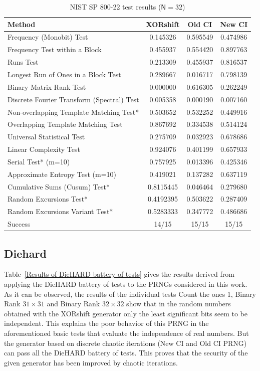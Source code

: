 \begin{table}[!t]
\renewcommand{\arraystretch}{1.3}
\caption{NIST SP 800-22 test results ($\mathsf{N}=32$)}
\label{The passing}
\centering
  \begin{tabular}{|l||c|c|c|}
    \hline
Method &XORshift& Old CI & New CI  \\ \hline\hline

Frequency (Monobit) Test 			&0.145326&0.595549&0.474986 \\ \hline
Frequency Test within a Block  			&0.455937&0.554420&0.897763  \\ \hline
Runs Test 					&0.213309&0.455937&0.816537 \\ \hline
Longest Run of Ones in a Block Test 		&0.289667&0.016717&0.798139   \\ \hline
Binary Matrix Rank Test 			&0.000000&0.616305&0.262249  \\ \hline
Discrete Fourier Transform (Spectral) Test	&0.005358&0.000190&0.007160   \\ \hline
Non-overlapping Template Matching Test* 	&0.503652&0.532252&0.449916 \\ \hline
Overlapping Template Matching Test   		&0.867692&0.334538&0.514124  \\ \hline
Universal Statistical Test   			&0.275709&0.032923&0.678686  \\ \hline
Linear Complexity Test  			&0.924076&0.401199&0.657933    \\ \hline
Serial Test* (m=10) 				&0.757925&0.013396&0.425346  \\ \hline
Approximate Entropy Test (m=10) 		&0.419021&0.137282&0.637119  \\ \hline
Cumulative Sums (Cusum) Test* 			&0.8115445&0.046464&0.279680\\ \hline
Random Excursions Test* 			&0.4192395&0.503622&0.287409   \\ \hline
Random Excursions Variant Test* 		&0.5283333&0.347772&0.486686    \\ \hline
Success 					& 14/15	  & 15/15  & 15/15 \\ \hline

  \end{tabular}
\end{table}

\subsection{Diehard}
\label{Subsec:DieHARD}

Table~\ref{Results of DieHARD battery of tests} gives the results derived from applying the DieHARD battery of tests to the PRNGs considered in this work. As it can be observed, the results of the individual tests Count the ones 1, Binary Rank $31 \times 31$ and Binary Rank $32 \times 32$ show that in the random numbers obtained with the XORshift generator only the least significant bits seem to be independent. This explains the poor behavior of this PRNG in the aforementioned basic tests that evaluate the independence of real numbers. But the generator based on discrete chaotic iterations (New CI and Old CI PRNG) can pass all the DieHARD battery of tests. 
This proves that the
security of the given generator has been improved by chaotic iterations.


